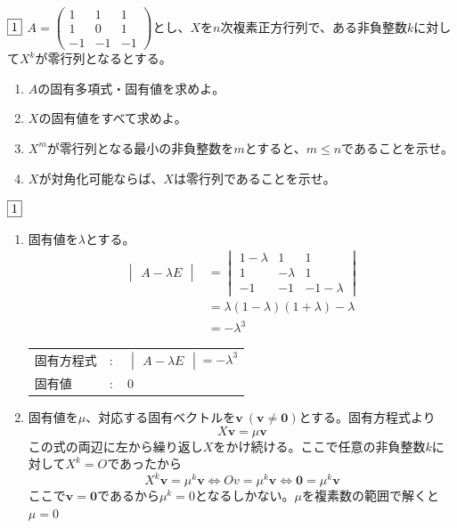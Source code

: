 \begin{tcolorbox} %
	$\fbox{1}$ $A= \begin{pmatrix}1& 1& 1\\ 1& 0& 1\\ {-1}& {-1}& {-1}\end{pmatrix}$とし、$X$を$n$次複素正方行列で、ある非負整数$k$に対して$X^k$が零行列となるとする。
\begin{enumerate}
	\item $A$の固有多項式・固有値を求めよ。
	\item $X$の固有値をすべて求めよ。
	\item $X^m$が零行列となる最小の非負整数を$m$とすると、$m\le n$であることを示せ。
	\item $X$が対角化可能ならば、$X$は零行列であることを示せ。
\end{enumerate}
\end{tcolorbox}

\begin{souanswer} %
	$\fbox{1}$
\begin{enumerate}
	\item 固有値を$\lambda$とする。
\begin{align*}
	\begin{vmatrix}A- \lambda E\end{vmatrix}
&= 
\begin{vmatrix}
	1- \lambda& 1& 1\\
	1& -\lambda& 1\\
	-1& -1& -1- \lambda
\end{vmatrix}\\
&= \lambda(1- \lambda)(1+ \lambda)- \lambda\\
&= -\lambda^3
\end{align*}
\begin{tabular}{lll}
	固有方程式& $\colon$& $\begin{vmatrix}A- \lambda E\end{vmatrix}= -\lambda^3$\\
	固有値& $\colon$& 0
\end{tabular}

	\item 固有値を$\mu$、対応する固有ベクトルを$\bm{v}\ (\bm{v}\ne \bm{0})$とする。固有方程式より
\begin{equation*}
	X\bm{v} = \mu \bm{v}
\end{equation*}
	この式の両辺に左から繰り返し$X$をかけ続ける。ここで任意の非負整数$k$に対して$X^k= O$であったから
\begin{equation*}
	X^k\bm{v}= \mu^k \bm{v}\iff Ov= \mu^k \bm{v}\iff \bm{0}= \mu^k \bm{v}
\end{equation*}
	ここで$\bm{v}= \bm{0}$であるから$\mu^k= 0$となるしかない。$\mu$を複素数の範囲で解くと$\mu= 0$
\end{enumerate}
\end{souanswer}